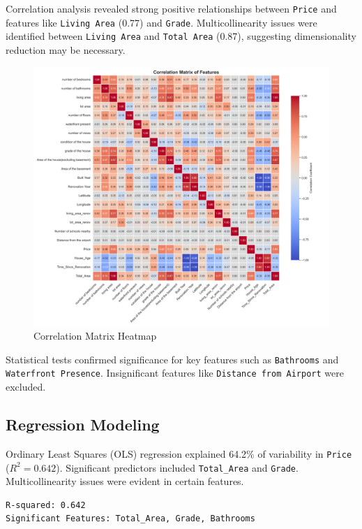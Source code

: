 \documentclass[11pt]{article}
\begin{document}
Correlation analysis revealed strong positive relationships between \texttt{Price} and features like \texttt{Living Area} (0.77) and \texttt{Grade}. Multicollinearity issues were identified between \texttt{Living Area} and \texttt{Total Area} (0.87), suggesting dimensionality reduction may be necessary.

\begin{figure}[htbp]
    \centering
    \includegraphics[width=\linewidth]{results/figures/correlation_matrix.png}
    \caption{Correlation Matrix Heatmap}
    \label{fig:correlation_matrix}
\end{figure}

Statistical tests confirmed significance for key features such as \texttt{Bathrooms} and \texttt{Waterfront Presence}. Insignificant features like \texttt{Distance from Airport} were excluded.

\subsection{Regression Modeling}

Ordinary Least Squares (OLS) regression explained 64.2\% of variability in \texttt{Price} (\(R^2 = 0.642\)). Significant predictors included \texttt{Total\_Area} and \texttt{Grade}. Multicollinearity issues were evident in certain features.

\begin{verbatim}
R-squared: 0.642
Significant Features: Total_Area, Grade, Bathrooms
\end{verbatim}
\end{document}
